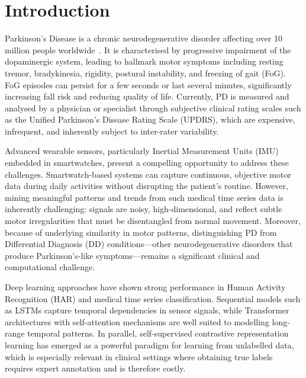 \documentclass[pmlr]{jmlr}
\begin{document}
\section{Introduction}
\label{sec:intro}

Parkinson's Disease is a chronic neurodegenerative disorder affecting
over 10 million people worldwide~\citep{ref}. It is characterised by
progressive impairment of the dopaminergic system, leading to hallmark
motor symptoms including resting tremor, bradykinesia, rigidity,
postural instability, and freezing of gait (FoG). FoG episodes can
persist for a few seconds or last several minutes, significantly
increasing fall risk and reducing quality of life. Currently, PD is
measured and analysed by a physician or specialist through subjective
clinical rating scales such as the Unified Parkinson's Disease Rating
Scale (UPDRS), which are expensive, infrequent, and inherently subject
to inter-rater variability.

Advanced wearable sensors, particularly Inertial Measurement Units
(IMU) embedded in smartwatches, present a compelling opportunity to
address these challenges. Smartwatch-based systems can capture
continuous, objective motor data during daily activities without
disrupting the patient's routine. However, mining meaningful patterns
and trends from such medical time series data is inherently
challenging: signals are noisy, high-dimensional, and reflect subtle
motor irregularities that must be disentangled from normal movement.
Moreover, because of underlying similarity in motor patterns,
distinguishing PD from Differential Diagnosis (DD) conditions---other
neurodegenerative disorders that produce Parkinson's-like
symptoms---remains a significant clinical and computational challenge.

Deep learning approaches have shown strong performance in Human
Activity Recognition (HAR) and medical time series classification.
Sequential models such as LSTMs capture temporal dependencies in
sensor signals, while Transformer architectures with self-attention
mechanisms are well suited to modelling long-range temporal patterns.
In parallel, self-supervised contrastive representation learning has
emerged as a powerful paradigm for learning from unlabelled data,
which is especially relevant in clinical settings where obtaining true
labels requires expert annotation and is therefore costly.
\end{document}
